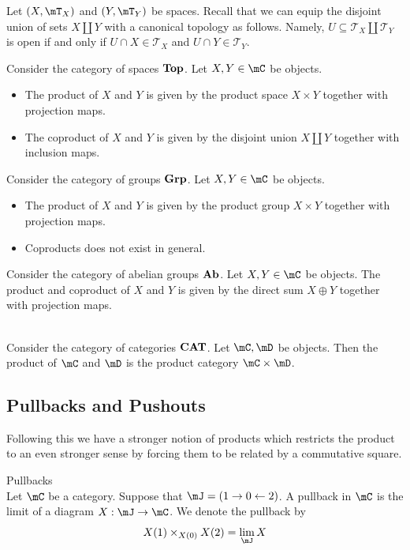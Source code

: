 \documentclass[a4paper]{article}
\begin{document}
Let $(X,\mT_X)$ and $(Y,\mT_Y)$ be spaces. Recall that we can equip the disjoint union of sets $X\amalg Y$ with a canonical topology as follows. Namely, $U\subseteq\mathcal{T}_X\amalg\mathcal{T}_Y$ is open if and only if $U\cap X\in\mathcal{T}_X$ and $U\cap Y\in\mathcal{T}_Y$. 

\begin{prp}{}{} Consider the category of spaces $\bold{Top}$. Let $X,Y\in\mC$ be objects. 
\begin{itemize}
\item The product of $X$ and $Y$ is given by the product space $X\times Y$ together with projection maps. 
\item The coproduct of $X$ and $Y$ is given by the disjoint union $X\amalg Y$ together with inclusion maps. 
\end{itemize}
\end{prp}

\begin{prp}{}{} Consider the category of groups $\bold{Grp}$. Let $X,Y\in\mC$ be objects. 
\begin{itemize}
\item The product of $X$ and $Y$ is given by the product group $X\times Y$ together with projection maps. 
\item Coproducts does not exist in general. 
\end{itemize}
\end{prp}

\begin{prp}{}{} Consider the category of abelian groups $\bold{Ab}$. Let $X,Y\in\mC$ be objects. The product and coproduct of $X$ and $Y$ is given by the direct sum $X\oplus Y$ together with projection maps. 
\end{prp}

\begin{prp}{}{}\\
Consider the category of categories $\bold{CAT}$. Let $\mC,\mD$ be objects. Then the product of $\mC$ and $\mD$ is the product category $\mC\times\mD$. 
\end{prp}

\subsection{Pullbacks and Pushouts}
Following this we have a stronger notion of products which restricts the product to an even stronger sense by forcing them to be related by a commutative square. 

\begin{defn}{Pullbacks}{}\\
Let $\mC$ be a category. Suppose that $\mJ=\left(1\rightarrow 0\leftarrow 2\right)$. A pullback in $\mC$ is the limit of a diagram $X:\mJ\to\mC$. We denote the pullback by $$X(1)\times_{X(0)}X(2)=\lim_\mJ X$$
\end{defn}
\end{document}

